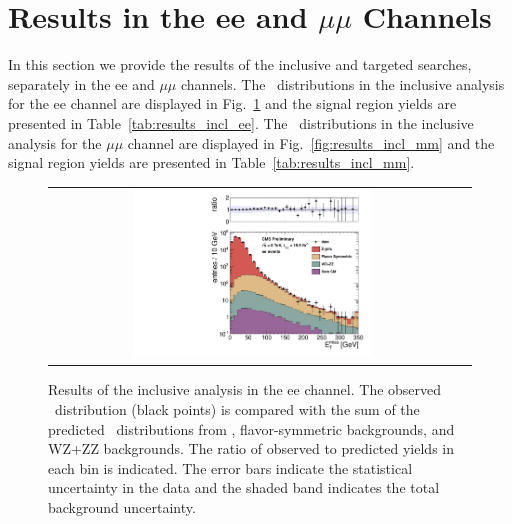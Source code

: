 \clearpage

\section{Results in the ee and $\mu\mu$ Channels}
\label{app:results}

In this section we provide the results of the inclusive and targeted searches, separately in the ee and $\mu\mu$ channels.
The \MET\ distributions in the inclusive analysis for the ee channel are displayed in Fig.~\ref{fig:results_incl_ee} and 
the signal region yields are presented in Table~\ref{tab:results_incl_ee}.
The \MET\ distributions in the inclusive analysis for the $\mu\mu$ channel are displayed in Fig.~\ref{fig:results_incl_mm} and 
the signal region yields are presented in Table~\ref{tab:results_incl_mm}.

\begin{figure}[!h]
\begin{center}
\begin{tabular}{cc}
\includegraphics[width=0.6\textwidth]{plots/pfmet_ee_19p5fb.pdf}
\end{tabular}
\caption{Results of the inclusive analysis in the ee channel. The observed \MET\ distribution (black points) is compared with the sum of the predicted \MET\
distributions from \zjets, flavor-symmetric backgrounds, and WZ+ZZ backgrounds. The ratio of observed to predicted yields in each bin is
indicated. The error bars indicate the statistical uncertainty in the data and the shaded band indicates the total background uncertainty.
\label{fig:results_incl_ee}
}
\end{center}
\end{figure}

